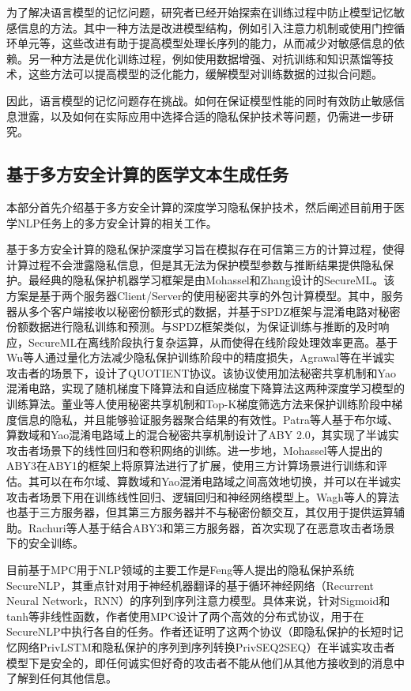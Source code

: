 为了解决语言模型的记忆问题，研究者已经开始探索在训练过程中防止模型记忆敏感信息的方法。其中一种方法是改进模型结构，例如引入注意力机制或使用门控循环单元等，这些改进有助于提高模型处理长序列的能力，从而减少对敏感信息的依赖。另一种方法是优化训练过程，例如使用数据增强、对抗训练和知识蒸馏等技术，这些方法可以提高模型的泛化能力，缓解模型对训练数据的过拟合问题。

因此，语言模型的记忆问题存在挑战。如何在保证模型性能的同时有效防止敏感信息泄露，以及如何在实际应用中选择合适的隐私保护技术等问题，仍需进一步研究。

\subsection{基于多方安全计算的医学文本生成任务}

本部分首先介绍基于多方安全计算的深度学习隐私保护技术，然后阐述目前用于医学NLP任务上的多方安全计算的相关工作。

基于多方安全计算的隐私保护深度学习旨在模拟存在可信第三方的计算过程，使得计算过程不会泄露隐私信息，但是其无法为保护模型参数与推断结果提供隐私保护。最经典的隐私保护机器学习框架是由Mohassel和Zhang设计的SecureML\cite{secureml}。该方案是基于两个服务器Client/Server的使用秘密共享的外包计算模型。其中，服务器从多个客户端接收以秘密份额形式的数据，并基于SPDZ框架\cite{spd}与混淆电路对秘密份额数据进行隐私训练和预测。与SPDZ框架类似，为保证训练与推断的及时响应，SecureML在离线阶段执行复杂运算，从而使得在线阶段处理效率更高。基于Wu等人\cite{wu2018training}通过量化方法减少隐私保护训练阶段中的精度损失，Agrawal等\cite{agrawal2019quotient}在半诚实攻击者的场景下，设计了QUOTIENT协议。该协议使用加法秘密共享机制和Yao混淆电路，实现了随机梯度下降算法和自适应梯度下降算法这两种深度学习模型的训练算法。董业等人\cite{FLSSGS}使用秘密共享机制和Top-K梯度筛选方法来保护训练阶段中梯度信息的隐私，并且能够验证服务器聚合结果的有效性。Patra等人\cite{patra2021aby2}基于布尔域、算数域和Yao混淆电路域上的混合秘密共享机制设计了ABY 2.0，其实现了半诚实攻击者场景下的线性回归和卷积网络的训练。进一步地，Mohassel\cite{mohassel2018aby3}等人提出的ABY3在ABY1\cite{demmler2015aby}的框架上将原算法进行了扩展，使用三方计算场景进行训练和评估。其可以在布尔域、算数域和Yao混淆电路域之间高效地切换，并可以在半诚实攻击者场景下用在训练线性回归、逻辑回归和神经网络模型上。Wagh等人\cite{SecureNN}的算法也基于三方服务器，但其第三方服务器并不与秘密份额交互，其仅用于提供运算辅助。Rachuri等人\cite{chaudhari2019trident}基于结合ABY3和第三方服务器，首次实现了在恶意攻击者场景下的安全训练。

目前基于MPC用于NLP领域的主要工作是Feng等人\cite{SecureNLP}提出的隐私保护系统SecureNLP，其重点针对用于神经机器翻译的基于循环神经网络（Recurrent Neural Network，RNN）的序列到序列注意力模型。具体来说，针对Sigmoid和tanh等非线性函数，作者使用MPC设计了两个高效的分布式协议，用于在SecureNLP中执行各自的任务。作者还证明了这两个协议（即隐私保护的长短时记忆网络PrivLSTM和隐私保护的序列到序列转换PrivSEQ2SEQ）在半诚实攻击者模型下是安全的，即任何诚实但好奇的攻击者不能从他们从其他方接收到的消息中了解到任何其他信息。

